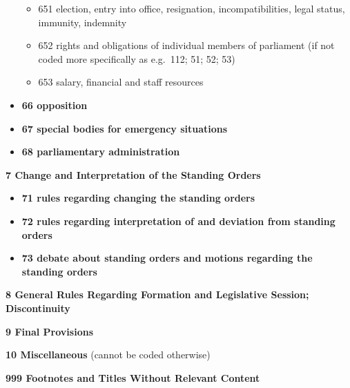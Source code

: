 \documentclass[]{article}
\providecommand{\tightlist}{%
  \setlength{\itemsep}{0pt}\setlength{\parskip}{0pt}}
\begin{document}
\begin{itemize}
  \begin{itemize}
  \tightlist
  \item
    651 election, entry into office, resignation, incompatibilities,
    legal status, immunity, indemnity
  \item
    652 rights and obligations of individual members of parliament (if
    not coded more specifically as e.g.~112; 51; 52; 53)
  \item
    653 salary, financial and staff resources
  \end{itemize}
\item
  \textbf{66 opposition}
\item
  \textbf{67 special bodies for emergency situations}
\item
  \textbf{68 parliamentary administration}
\end{itemize}

\textbf{7 Change and Interpretation of the Standing Orders}

\begin{itemize}
\tightlist
\item
  \textbf{71 rules regarding changing the standing orders}
\item
  \textbf{72 rules regarding interpretation of and deviation from
  standing orders}
\item
  \textbf{73 debate about standing orders and motions regarding the
  standing orders}
\end{itemize}

\textbf{8 General Rules Regarding Formation and Legislative Session;
Discontinuity}

\textbf{9 Final Provisions}

\textbf{10 Miscellaneous} (cannot be coded otherwise)

\textbf{999 Footnotes and Titles Without Relevant Content}
\end{document}
